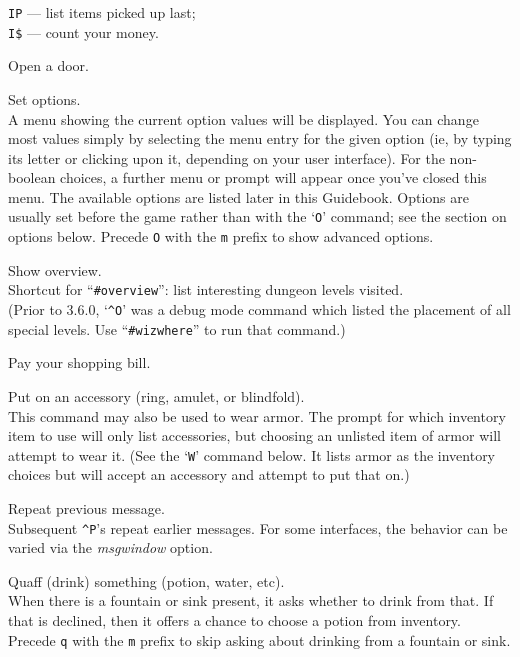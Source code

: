 \documentclass[titlepage]{article}
\begin{document}
\begin{description}[font=\mdseries\ttfamily]
\texttt{IP} --- list items picked up last;\\
\texttt{I\$} --- count your money.
\item[o]
Open a door.
\item[O]
Set options.\\
A menu showing the current option values will be
displayed.  You can change most values simply by selecting the menu
entry for the given option (ie, by typing its letter or clicking upon
it, depending on your user interface).  For the non-boolean choices,
a further menu or prompt will appear once you've closed this menu.
The available options
are listed later in this Guidebook.  Options are usually set before the
game rather than with the `\texttt{O}' command; see the section on options below.
Precede \texttt{O} with the \texttt{m} prefix to show advanced options.
\item[\textasciicircum O]
Show overview.\\
Shortcut for ``\texttt{\#overview}'':
list interesting dungeon levels visited.\\
(Prior to 3.6.0, `\texttt{\textasciicircum O}' was a debug mode command which listed
the placement of all special levels.
Use ``\texttt{\#wizwhere}'' to run that command.)
\item[p]
Pay your shopping bill.
\item[P]
Put on an accessory (ring, amulet, or blindfold).\\
This command may also be used to wear armor.  The prompt for
which inventory item to use will only list accessories, but choosing
an unlisted item of armor will attempt to wear it.
(See the `\texttt{W}' command below.  It lists armor as the inventory
choices but will accept an accessory and attempt to put that on.)
\item[\textasciicircum P]
Repeat previous message.\\
Subsequent \texttt{\textasciicircum P}'s repeat earlier messages.
For some interfaces, the behavior can be varied via the
\textit{msg\textunderscore window} option.
\item[q]
Quaff (drink) something (potion, water, etc).\\
When there is a fountain or sink present, it asks whether to drink
from that.
If that is declined, then it offers a chance to choose a potion from
inventory.
Precede \texttt{q} with the \texttt{m} prefix to skip asking about
drinking from a fountain or sink.
\item[Q]

\end{description}
\end{document}
